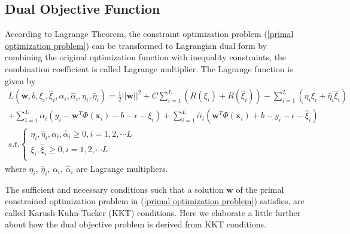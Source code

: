 \subsection{Dual Objective Function}\label{dual objective Function}
According to Lagrange Theorem, the constraint optimization problem (\ref{primal optimization problem}) can be transformed to Lagrangian dual form by combining the original optimization function with inequality constraints, the combination coefficient is called Lagrange multiplier. The Lagrange function is given by 
\begin{eqnarray}
\nonumber
L(\mathbf{w}, b, \xi_{i}, \hat{\xi}_{i}, \alpha_{i}, \hat{\alpha}_{i}, \eta_{i}, \hat{\eta}_{i})=
\frac{1}{2}||\mathbf{w}||^{2}+C\sum_{i=1}^{L}(R(\xi_{i})+R(\hat{\xi}_{i}))-\sum_{i=1}^{L}(\eta_{i}\xi_{i}+\hat{\eta}_{i}\hat{\xi}_{i})\\
\nonumber
+\sum_{i=1}^{L}\alpha_{i}(y_{i}-\mathbf{w}^{T}\Phi(\mathbf{x}_{i})-b-\epsilon-\xi_{i})+\sum_{i=1}^{L}\hat{\alpha}_{i}(\mathbf{w}^{T}\Phi(\mathbf{x}_{i})+b-y_{i}-\epsilon-\hat{\xi}_{i})\\
s.t. \left\{\begin{array}{cc}
\eta_{i}, \hat{\eta}_{i}, \alpha_{i}, \hat{\alpha}_{i}\geq 0, i=1,2,\cdots L\\
\xi_{i}, \hat{\xi}_{i}\geq  0, i=1,2,\cdots L\\
\end{array}\right.
\label{lagrange duality1}
\end{eqnarray}
where $\eta_{i}$, $\hat{\eta}_{i}$, $\alpha_{i}$, $\hat{\alpha}_{i}$ are Lagrange multipliers.

The sufficient and necessary conditions such that a solution $\mathbf{w}$ of the primal constrained optimization problem in (\ref{primal optimization problem}) satisfies, are called Karush-Kuhn-Tucker (KKT) conditions. Here we elaborate a little further about how the dual objective problem is derived from KKT conditions.

